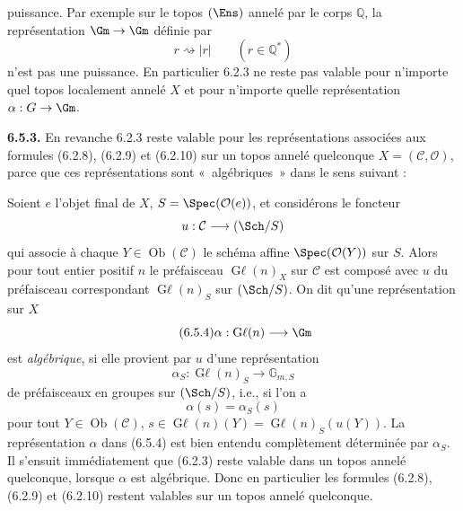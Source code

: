 puissance. Par exemple sur le topos \((\Ens)\) annelé par le corps \(\mathbb Q\), la représentation \(\Gm\to\Gm\) définie par
\[
 r\rightsquigarrow|r|\qquad(r\in\mathbb Q^*)
\]
n'est pas une puissance. En particulier 6.2.3 ne reste pas valable pour n'importe quel topos localement annelé \(X\) et pour n'importe quelle représentation \(\alpha:G\to\Gm\).

\textbf{6.5.3.} En revanche 6.2.3 reste valable pour les représentations associées aux formules (6.2.8), (6.2.9) et (6.2.10) sur un topos annelé quelconque \(X=(\mathcal C,\mathcal O)\), parce que ces représentations sont «~algébriques~» dans le sens suivant :

Soient \(e\) l'objet final de \(X\), \(S=\Spec(\mathcal O(e))\), et considérons le foncteur
\[
 u:\mathcal C\longrightarrow(\Sch/S)
\]
qui associe à chaque \(Y\in\operatorname{Ob}(\mathcal C)\) le schéma affine \(\Spec(\mathcal O(Y))\) sur \(S\). Alors pour tout entier positif \(n\) le préfaisceau \(\operatorname{G\ell}(n)_X\) sur \(\mathcal C\) est composé avec \(u\) du préfaisceau correspondant \(\operatorname{G\ell}(n)_S\) sur \((\Sch/S)\). On dit qu'une représentation sur \(X\)
\begin{equation}\tag{6.5.4}
 \alpha:\operatorname{G\ell}(n)\longrightarrow\Gm
\end{equation}
est \emph{algébrique}, si elle provient par \(u\) d'une représentation
\begin{equation}\tag{6.5.5}
 \alpha_S:\operatorname{G\ell}(n)_S\longrightarrow\mathbb G_{m,S}
\end{equation}
de préfaisceaux en groupes sur \((\Sch/S)\), i.e., si l'on a
\[
 \alpha(s)=\alpha_S(s)
\]
pour tout \(Y\in\operatorname{Ob}(\mathcal C)\), \(s\in\operatorname{G\ell}(n)(Y)=\operatorname{G\ell}(n)_S(u(Y))\). La représentation \(\alpha\) dans (6.5.4) est bien entendu complètement déterminée par \(\alpha_S\). Il s'ensuit immédiatement que (6.2.3) reste valable dans un topos annelé quelconque, lorsque \(\alpha\) est algébrique. Donc en particulier les formules (6.2.8), (6.2.9) et (6.2.10) restent valables sur un topos annelé quelconque.

